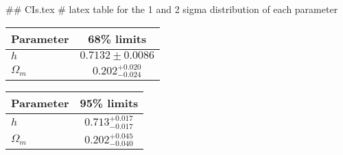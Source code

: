 ## CIs.tex
# latex table for the 1 and 2 sigma distribution of each parameter

\begin{tabular} { l  c}
 Parameter &  68\% limits\\
\hline
{\boldmath$h              $} & $0.7132\pm 0.0086          $\\
{\boldmath$\Omega_m       $} & $0.202^{+0.020}_{-0.024}   $\\
\hline
\end{tabular}

\begin{tabular} { l  c}
 Parameter &  95\% limits\\
\hline
{\boldmath$h              $} & $0.713^{+0.017}_{-0.017}   $\\
{\boldmath$\Omega_m       $} & $0.202^{+0.045}_{-0.040}   $\\
\hline
\end{tabular}

